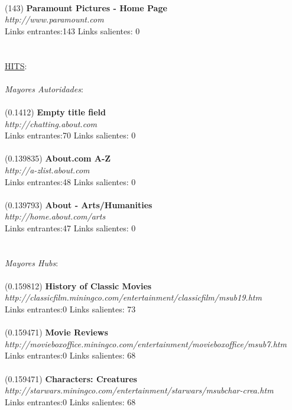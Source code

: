 \documentclass[a4paper]{article}
\begin{document}
\\
(143)\textbf{ Paramount Pictures - Home Page} \\
\textit{http://www.paramount.com }\\
Links entrantes:143 \indent Links salientes: 0\\
\\
\\
\underline{HITS}: \\
\\
\emph{Mayores Autoridades}: \\
\\
(0.1412) \textbf{Empty title field} \\
\textit{http://chatting.about.com} \\
Links entrantes:70 \indent Links salientes: 0\\
\\
(0.139835)\textbf{ About.com A-Z} \\
\textit{http://a-zlist.about.com} \\
Links entrantes:48 \indent Links salientes: 0\\
\\
(0.139793) \textbf{About - Arts/Humanities} \\
\textit{http://home.about.com/arts} \\
Links entrantes:47 \indent Links salientes: 0\\
\\
\\
\emph{Mayores Hubs}: \\
\\
(0.159812) \textbf{History of Classic Movies} \\
\textit{http://classicfilm.miningco.com/entertainment/classicfilm/msub19.htm} \\
Links entrantes:0 \indent Links salientes: 73\\
\\
(0.159471)\textbf{ Movie Reviews} \\
\textit{http://movieboxoffice.miningco.com/entertainment/movieboxoffice/msub7.htm} \\
Links entrantes:0 \indent Links salientes: 68\\
\\
(0.159471) \textbf{Characters: Creatures} \\
\textit{http://starwars.miningco.com/entertainment/starwars/msubchar-crea.htm }\\
Links entrantes:0 \indent Links salientes: 68\\
\\
\end{document}
